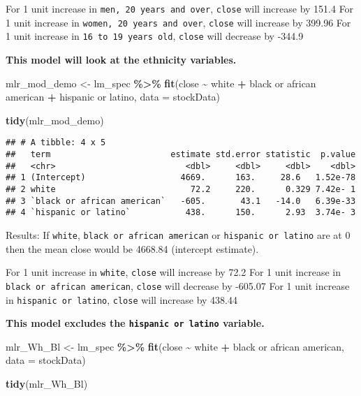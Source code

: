 \documentclass[
]{article}
\newenvironment{Shaded}{\begin{snugshade}}{\end{snugshade}}
\newcommand{\AttributeTok}[1]{\textcolor[rgb]{0.13,0.29,0.53}{#1}}
\newcommand{\FunctionTok}[1]{\textcolor[rgb]{0.13,0.29,0.53}{\textbf{#1}}}
\newcommand{\NormalTok}[1]{#1}
\newcommand{\OtherTok}[1]{\textcolor[rgb]{0.56,0.35,0.01}{#1}}
\newcommand{\SpecialCharTok}[1]{\textcolor[rgb]{0.81,0.36,0.00}{\textbf{#1}}}
\newcommand{\StringTok}[1]{\textcolor[rgb]{0.31,0.60,0.02}{#1}}
\begin{document}
For 1 unit increase in \texttt{men,\ 20\ years\ and\ over},
\texttt{close} will increase by 151.4 For 1 unit increase in
\texttt{women,\ 20\ years\ and\ over}, \texttt{close} will increase by
399.96 For 1 unit increase in \texttt{16\ to\ 19\ years\ old},
\texttt{close} will decrease by -344.9

\textbf{This model will look at the ethnicity variables.}

\begin{Shaded}
\begin{Highlighting}[]
\NormalTok{mlr\_mod\_demo }\OtherTok{\textless{}{-}}\NormalTok{ lm\_spec }\SpecialCharTok{\%\textgreater{}\%} 
  \FunctionTok{fit}\NormalTok{(close }\SpecialCharTok{\textasciitilde{}}\NormalTok{ white }\SpecialCharTok{+} \StringTok{\textasciigrave{}}\AttributeTok{black or african american}\StringTok{\textasciigrave{}} \SpecialCharTok{+} \StringTok{\textasciigrave{}}\AttributeTok{hispanic or latino}\StringTok{\textasciigrave{}}\NormalTok{, }\AttributeTok{data =}\NormalTok{ stockData)}

\FunctionTok{tidy}\NormalTok{(mlr\_mod\_demo)}
\end{Highlighting}
\end{Shaded}

\begin{verbatim}
## # A tibble: 4 x 5
##   term                        estimate std.error statistic  p.value
##   <chr>                          <dbl>     <dbl>     <dbl>    <dbl>
## 1 (Intercept)                   4669.      163.     28.6   1.52e-78
## 2 white                           72.2     220.      0.329 7.42e- 1
## 3 `black or african american`   -605.       43.1   -14.0   6.39e-33
## 4 `hispanic or latino`           438.      150.      2.93  3.74e- 3
\end{verbatim}

Results: If \texttt{white}, \texttt{black\ or\ african\ american} or
\texttt{hispanic\ or\ latino} are at 0 then the mean close would be
4668.84 (intercept estimate).

For 1 unit increase in \texttt{white}, \texttt{close} will increase by
72.2 For 1 unit increase in \texttt{black\ or\ african\ american},
\texttt{close} will decrease by -605.07 For 1 unit increase in
\texttt{hispanic\ or\ latino}, \texttt{close} will increase by 438.44

\textbf{This model excludes the \texttt{hispanic\ or\ latino} variable.}

\begin{Shaded}
\begin{Highlighting}[]
\NormalTok{mlr\_Wh\_Bl }\OtherTok{\textless{}{-}}\NormalTok{ lm\_spec }\SpecialCharTok{\%\textgreater{}\%} 
  \FunctionTok{fit}\NormalTok{(close }\SpecialCharTok{\textasciitilde{}}\NormalTok{ white }\SpecialCharTok{+} \StringTok{\textasciigrave{}}\AttributeTok{black or african american}\StringTok{\textasciigrave{}}\NormalTok{, }\AttributeTok{data =}\NormalTok{ stockData)}

\FunctionTok{tidy}\NormalTok{(mlr\_Wh\_Bl)}
\end{Highlighting}
\end{Shaded}
\end{document}
